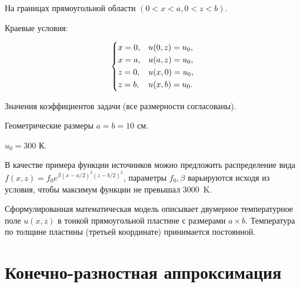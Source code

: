 \documentclass[12pt, a4paper]{article}
\begin{document}
На границах прямоугольной области $(0 < x < a, 0 < z < b)$.

\begin{center}
\end{center}

Краевые условия:

\begin{equation}
	\begin{dcases}
		x = 0, & u(0, z) = u_0, \\
		x = a, & u(a, z) = u_0, \\
		z = 0, & u(x, 0) = u_0, \\
		z = b, & u(x, b) = u_0. \\
	\end{dcases}
\end{equation}

Значения коэффициентов задачи (все размерности согласованы).

Геометрические размеры $a = b = 10$ см.

$u_0 = 300$ К.

В качестве примера функции источников можно предложить распределение вида $f(x, z) = f_0 e^{\beta(x - a/2)^2(z - b/2)^2}$, параметры $f_0, \beta$ варьируются исходя из условия, чтобы максимум функции не превышал $3000$~K.

Сформулированная математическая модель описывает двумерное температурное поле $u(x, z)$ в тонкой прямоугольной пластине с размерами $a \times b$.
Температура по толщине пластины (третьей координате) принимается постоянной.

\section{Конечно-разностная аппроксимация}
\end{document}

